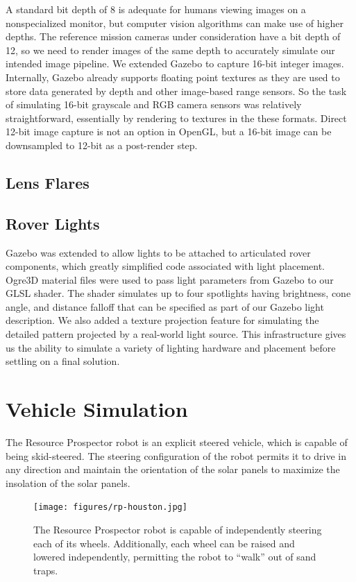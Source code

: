\documentclass[twocolumn,letterpaper]{IEEEAerospaceCLS}  %
\begin{document}
A standard bit depth of 8 is adequate for humans viewing images on a nonspecialized monitor, but computer vision algorithms can make use of higher depths. 
The reference mission cameras under consideration have a bit depth of 12, so we need to render images of the same depth to accurately simulate our intended image pipeline. 
We extended Gazebo to capture 16-bit integer images. 
Internally, Gazebo already supports floating point textures as they are used to store data generated by depth and other image-based range sensors. So the task of simulating 16-bit grayscale and RGB camera sensors was relatively straightforward, essentially by rendering to textures in the these formats. 
Direct 12-bit image capture is not an option in OpenGL, but a 16-bit image can be downsampled to 12-bit as a post-render step.

\subsection{Lens Flares}


\subsection{Rover Lights}
Gazebo was extended to allow lights to be attached to articulated rover components, which greatly simplified code associated with light placement. 
Ogre3D material files were used to pass light parameters from Gazebo to our GLSL shader. 
The shader simulates up to four spotlights having brightness, cone angle, and distance falloff that can be specified as part of our Gazebo light description.
We also added a texture projection feature for simulating the detailed pattern projected by a real-world light source. 
This infrastructure gives us the ability to simulate a variety of lighting hardware and placement before settling on a final solution. 

\section{Vehicle Simulation}

The Resource Prospector robot is an explicit steered vehicle, which is capable of being skid-steered. 
The steering configuration of the robot permits it to drive in any direction and maintain the orientation of the solar panels to maximize the insolation of the solar panels.  

\begin{figure}[htp!]
\centering
\texttt{[image: figures/rp-houston.jpg]}
\caption{The Resource Prospector robot is capable of independently steering each of its wheels.  
Additionally, each wheel can be raised and lowered independently, permitting the robot to ``walk'' out of sand traps.  \label{fig:rp-houston}}
\end{figure}
\end{document}
